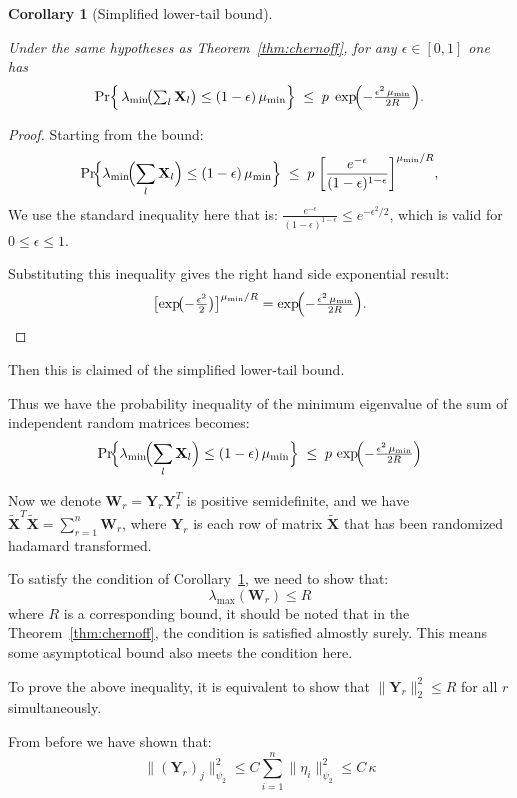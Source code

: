 \documentclass{beamer}
\newtheorem{cor}{Corollary}
\theoremstyle{remark}
\begin{document}
\begin{frame}
\begin{cor}[Simplified lower‐tail bound]
    \label{cor:simplified}

    Under the same hypotheses as Theorem~\ref{thm:chernoff}, for any \(\epsilon\in[0,1]\) one has
    \[
      \Pr\Bigl\{\,
        \lambda_{\min}\!\bigl(\textstyle\sum_{l}\mathbf{X}_l\bigr)
          \le (1-\epsilon)\,\mu_{\min}
        \Bigr\}
        \;\le\;
        p\;\exp\!\Bigl(-\tfrac{\epsilon^{2}\,\mu_{\min}}{2R}\Bigr).
    \]
  \end{cor}
    
    \begin{proof}
    Starting from the bound:
    \[
    \Pr\!\Bigl\{
      \lambda_{\min}\!\Bigl(\sum_l\mathbf X_l\Bigr)\le (1-\epsilon)\,\mu_{\min}
    \Bigr\}
    \;\le\;
    p\;\biggl[\frac{e^{-\epsilon}}{(1-\epsilon)^{1-\epsilon}}\biggr]^{\mu_{\min}/R},
    \]
    We use the standard inequality here that is:
    \(\tfrac{e^{-\epsilon}}{(1-\epsilon)^{1-\epsilon}}\le e^{-\epsilon^{2}/2}\),
    which is valid for \(0\le\epsilon\le1\).  
    
    Substituting this inequality gives the right hand side exponential result:
    \[
    \bigl[\exp\!\bigl(-\tfrac{\epsilon^{2}}{2}\bigr)\bigr]^{\mu_{\min}/R}
    =
    \exp\!\Bigl(-\tfrac{\epsilon^{2}\,\mu_{\min}}{2R}\Bigr).
    \]
\end{proof}
\end{frame}
\begin{frame}
Then this is claimed of the simplified lower-tail bound.

Thus we have the probability inequality of the minimum eigenvalue of the sum of independent random matrices becomes:
\[
  \Pr\!\Bigl\{
      \lambda_{\min}\!\Bigl(\sum_l\mathbf X_l\Bigr)\le (1-\epsilon)\,\mu_{\min}
    \Bigr\}
  \;\le\;
  p\,\exp\!\Bigl(-\tfrac{\epsilon^{2}\,\mu_{\min}}{2R}\Bigr)
\]

\end{frame}
\begin{frame}
Now we denote $\mathbf{W}_r = \mathbf{Y}_r\mathbf{Y}_r^T$ is positive semidefinite, and we have $\tilde{\mathbf{X}}^T\tilde{\mathbf{X}} = \sum_{r=1}^n \mathbf{W}_r$, where $\mathbf{Y}_r$ is each row of matrix $\mathbf{\tilde{X}}$ that has been randomized hadamard transformed.

To satisfy the condition of Corollary~\ref{cor:simplified}, we need to show that:
\[
\lambda_{\max}(\mathbf{W}_r) \le R
\]
where $R$ is a corresponding bound, it should be noted that in the Theorem~\ref{thm:chernoff}, the condition is satisfied almostly surely. This means some asymptotical bound also meets the condition here.

To prove the above inequality, it is equivalent to show that $\|\mathbf{Y}_r\|_2^{2} \le R$ for all $r$ simultaneously.

From before we have shown that:
\[
    \|(\mathbf{Y}_{r})_{j}\|_{\psi_{2}}^{2}
       \le C \sum_{i=1}^{n}\|\eta_{i}\|_{\psi_{2}}^{2}
       \le C\,\kappa
  \]
\end{frame}
\end{document}
